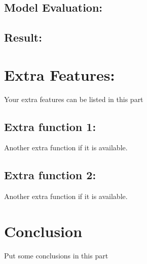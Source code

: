 \documentclass[a4paper,11pt]{article}
\theoremstyle{mytheor}
\begin{document}
\subsection{Model Evaluation:}
\subsection{Result:}

\section{Extra Features:}
Your extra features can be listed in this part

\subsection{Extra function 1:}
Another extra function if it is available. 

\subsection{Extra function 2:}
Another extra function if it is available. 

\section{Conclusion}
Put some conclusions in this part




\end{document}
